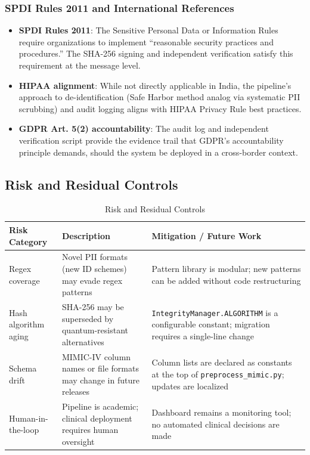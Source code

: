 \documentclass[12pt,a4paper]{report}
\begin{document}
\subsubsection{SPDI Rules 2011 and International References}

\begin{itemize}
    \item \textbf{SPDI Rules 2011}: The Sensitive Personal Data or Information Rules
    require organizations to implement ``reasonable security practices and
    procedures.'' The SHA-256 signing and independent verification satisfy this
    requirement at the message level.

    \item \textbf{HIPAA alignment}: While not directly applicable in India, the
    pipeline's approach to de-identification (Safe Harbor method analog via
    systematic PII scrubbing) and audit logging aligns with HIPAA Privacy Rule
    best practices.

    \item \textbf{GDPR Art. 5(2) accountability}: The audit log and independent
    verification script provide the evidence trail that GDPR's accountability
    principle demands, should the system be deployed in a cross-border context.
\end{itemize}

\subsection{Risk and Residual Controls}

\begin{table}[H]
\centering
\caption{Risk and Residual Controls}
\begin{tabular}{p{3cm} p{5cm} p{5cm}}
\toprule
Risk Category & Description & Mitigation / Future Work \\
\midrule
Regex coverage & Novel PII formats (new ID schemes) may evade regex patterns &
Pattern library is modular; new patterns can be added without code restructuring
\\[0.4em]
Hash algorithm aging & SHA-256 may be superseded by quantum-resistant alternatives &
\texttt{IntegrityManager.ALGORITHM} is a configurable constant; migration requires
a single-line change \\[0.4em]
Schema drift & MIMIC-IV column names or file formats may change in future releases &
Column lists are declared as constants at the top of \texttt{preprocess\_mimic.py};
updates are localized \\[0.4em]
Human-in-the-loop & Pipeline is academic; clinical deployment requires human oversight &
Dashboard remains a monitoring tool; no automated clinical decisions are made \\
\bottomrule
\end{tabular}
\end{table}
\end{document}
